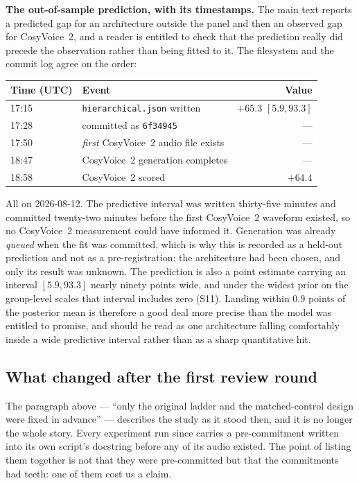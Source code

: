 \documentclass[11pt]{article}
\begin{document}
\noindent\textbf{The out-of-sample prediction, with its timestamps.} The main
text reports a predicted gap for an architecture outside the panel and then an
observed gap for CosyVoice~2, and a reader is entitled to check that the
prediction really did precede the observation rather than being fitted to it.
The filesystem and the commit log agree on the order:

\begin{center}\small
\begin{tabular}{llr}
\toprule
Time (UTC) & Event & Value \\
\midrule
17{:}15 & \texttt{hierarchical.json} written & $+65.3$ $[5.9, 93.3]$ \\
17{:}28 & committed as \texttt{6f34945} & --- \\
17{:}50 & \emph{first} CosyVoice~2 audio file exists & --- \\
18{:}47 & CosyVoice~2 generation completes & --- \\
18{:}58 & CosyVoice~2 scored & $+64.4$ \\
\bottomrule
\end{tabular}
\end{center}

\noindent All on 2026-08-12. The predictive interval was written thirty-five
minutes and committed twenty-two minutes before the first CosyVoice~2 waveform
existed, so no CosyVoice~2 measurement could have informed it. Generation was
already \emph{queued} when the fit was committed, which is why this is recorded
as a held-out prediction and not as a pre-registration: the architecture had
been chosen, and only its result was unknown. The prediction is also a point
estimate carrying an interval $[5.9, 93.3]$ nearly ninety points wide, and under
the widest prior on the group-level scales that interval includes zero
(S11). Landing within $0.9$ points of the posterior mean is therefore a good
deal more precise than the model was entitled to promise, and should be read as
one architecture falling comfortably inside a wide predictive interval rather
than as a sharp quantitative hit.

\subsection{What changed after the first review round}

The paragraph above --- ``only the original ladder and the matched-control
design were fixed in advance'' --- describes the study as it stood then, and it
is no longer the whole story. Every experiment run since carries a
pre-commitment written into its own script's docstring before any of its audio
existed. The point of listing them together is not that they were pre-committed
but that the commitments had teeth: one of them cost us a claim.
\end{document}
